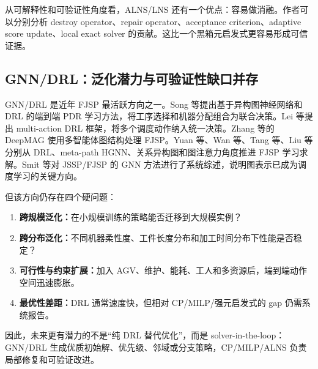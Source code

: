 \documentclass[UTF8,a4paper,11pt]{ctexart}
\begin{document}
从可解释性和可验证性角度看，ALNS/LNS 还有一个优点：容易做消融。作者可以分别分析 destroy operator、repair operator、acceptance criterion、adaptive score update、local exact solver 的贡献。这比一个黑箱元启发式更容易形成可信证据。

\subsection{GNN/DRL：泛化潜力与可验证性缺口并存}

GNN/DRL 是近年 FJSP 最活跃方向之一。Song 等提出基于异构图神经网络和 DRL 的端到端 PDR 学习方法，将工序选择和机器分配组合为联合决策\cite{Song2022GNNDRL}。Lei 等提出 multi-action DRL 框架，将多个调度动作纳入统一决策\cite{Lei2022MultiAction}。Zhang 等的 DeepMAG 使用多智能体图结构处理 FJSP\cite{Zhang2023DeepMAG}。Yuan 等、Wan 等、Tang 等、Liu 等分别从 DRL、meta-path HGNN、关系异构图和图注意力角度推进 FJSP 学习求解\cite{Yuan2024DRL,Wan2024MHGNN,Tang2024HGNNR,Liu2025GNN}。Smit 等对 JSSP/FJSP 的 GNN 方法进行了系统综述，说明图表示已成为调度学习的关键方向\cite{Smit2025GNNReview}。

但该方向仍存在四个硬问题：
\begin{enumerate}
    \item \textbf{跨规模泛化：}在小规模训练的策略能否迁移到大规模实例？
    \item \textbf{跨分布泛化：}不同机器柔性度、工件长度分布和加工时间分布下性能是否稳定？
    \item \textbf{可行性与约束扩展：}加入 AGV、维护、能耗、工人和多资源后，端到端动作空间迅速膨胀。
    \item \textbf{最优性差距：}DRL 通常速度快，但相对 CP/MILP/强元启发式的 gap 仍需系统报告。
\end{enumerate}

因此，未来更有潜力的不是“纯 DRL 替代优化”，而是 solver-in-the-loop：GNN/DRL 生成优质初始解、优先级、邻域或分支策略，CP/MILP/ALNS 负责局部修复和可验证改进。
\end{document}
